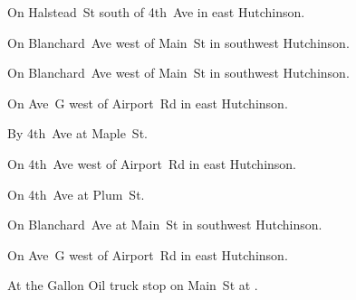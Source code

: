 

\begin{LocationList}

On Halstead~St south of 4th~Ave in east Hutchinson.

On Blanchard~Ave west of Main~St in southwest Hutchinson.

On Blanchard~Ave west of Main~St in southwest Hutchinson.

On Ave~G west of Airport~Rd in east Hutchinson.

By 4th~Ave at Maple~St.

On 4th~Ave west of Airport~Rd in east Hutchinson.

On 4th~Ave at Plum~St.

\Location{\TruckService \Service \Rest}
On Blanchard~Ave at Main~St in southwest Hutchinson.

On Ave~G west of Airport~Rd in east Hutchinson.

At the Gallon Oil truck stop on   Main~St at .

\end{LocationList}
